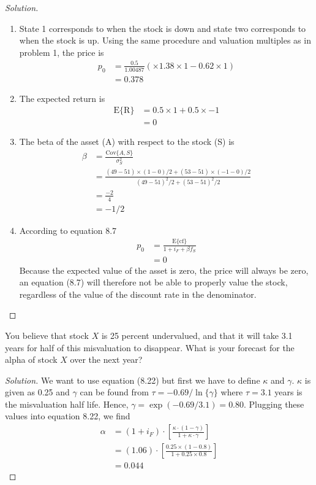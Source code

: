 \begin{proof}[Solution]\quad\\
 \begin{enumerate}[label=(\alph*)]
  \item{State 1 corresponds to when the stock is down and state two corresponds to when the stock is up. Using the same procedure and valuation multiples as in problem 1, the price is
	\begin{align*}
	 p_{0} &= \frac{0.5}{1.00487}\left(\times1.38\times 1 - 0.62\times1\right)\\
	       &= 0.378
	\end{align*}
	}
  \item{The expected return is
	\begin{align*}
	 \mathrm{E\{R\}} &= 0.5 \times 1 + 0.5\times -1\\
			 &= 0
	\end{align*}
	}
  \item{The beta of the asset (A) with respect to the stock (S) is
	\begin{align*}
	  \beta &= \frac{\mathrm{Cov}\{A,S\}}{\sigma_{S}^{2}} \\
		&= \frac{ (49-51)\times(1-0)/2 + (53-51)\times(-1-0)/2}{(49-51)^{2}/2 + (53-51)^{2}/2}\\
		&= \frac{-2}{4}\\
		&= -1/2
	\end{align*}
	}
  \item{According to equation 8.7
	\begin{align*}
	 p_{0} &= \frac{\mathrm{E}\{\mathrm{cf}\}}{1+i_{F}+\beta f_{S}} \\
	       &= 0
	\end{align*}
	Because the expected value of the asset is zero, the price will always be zero, an equation (8.7) will therefore not be able to properly value the stock, regardless of the value of the discount rate in the denominator.
	}
 \end{enumerate}

\end{proof}

\begin{problem}{8.4}
  You believe that stock $X$ is 25 percent undervalued, and that it will take 3.1 years for half of this misvaluation to disappear. What is your forecast for the alpha of stock $X$ over the next year?
\end{problem}

\begin{proof}[Solution]
  We want to use equation (8.22) but first we have to define $\kappa$ and $\gamma$. $\kappa$ is given as 0.25 and $\gamma$ can be found from $\tau=-0.69/\ln\{\gamma\}$ where $\tau=3.1$ years is the misvaluation half life. Hence, $\gamma=\exp(-0.69/3.1)=0.80$. Plugging these values into equation 8.22, we find
  \begin{align*}
   \alpha &= (1+i_{F})\cdot\left[\frac{\kappa\cdot(1-\gamma)}{1+\kappa\cdot\gamma}\right]\\
	  &= (1.06)\cdot\left[\frac{0.25\times(1-0.8)}{1+0.25\times0.8}\right]\\
	  &=0.044
  \end{align*}

\end{proof}